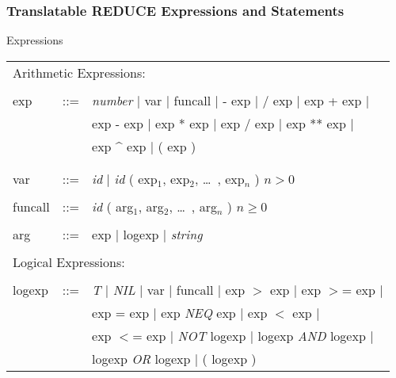 \subsubsection{Translatable REDUCE Expressions and Statements}
\begin{describe}{Expressions}
\begin{tabular}{lll}
\multicolumn{3}{l}{Arithmetic Expressions:} \\
& & \\
exp & ::= & {\it number} $\mid$  var  $\mid$  funcall  $\mid$  - exp $\mid$
/ exp  $\mid$  exp + exp  $\mid$ \\
	& & exp - exp $\mid$ exp * exp  $\mid$  exp / exp  $\mid$  exp ** exp
 $\mid$ \\
        & & exp \^{} exp  $\mid$ ( exp )\\\\
& & \\
var & ::= & {\it id} $\mid$ {\it id} ( exp$_1$, exp$_2$, \dots\ , exp$_n$ )
 $n > 0$ \\
& & \\
funcall & ::= & {\it id} ( arg$_1$, arg$_2$, \dots\ , arg$_n$ ) $n \geq 0$ \\
& & \\
arg & ::=  & exp $\mid$ logexp $\mid$ {\it string} \\
& &\\
\multicolumn{3}{l}{Logical Expressions:}\\
& & \\
logexp & ::= & {\it T} $\mid$ {\it NIL} $\mid$  var  $\mid$  funcall $\mid$
        exp $>$ exp  $\mid$  exp $>$= exp $\mid$\\
        & & exp = exp  $\mid$ exp {\it NEQ} exp $\mid$ exp $<$ exp $\mid$ \\
	& & exp $<$= exp $\mid$ {\it NOT\/} logexp  $\mid$ logexp {\it AND\/}
 logexp $\mid$ \\
        & & logexp {\it OR\/} logexp  $\mid$  ( logexp )\\
\end{tabular}
\end{describe}

